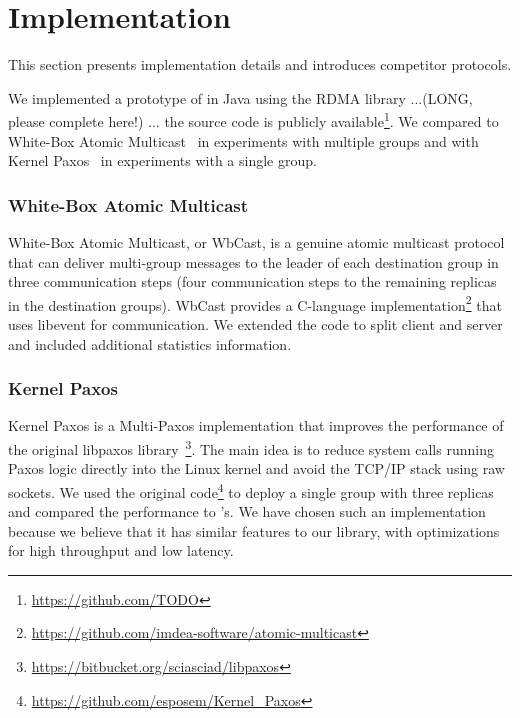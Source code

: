 \section{Implementation}
\label{sec:implementation}
This section presents implementation details and introduces competitor protocols.

We implemented a prototype of \libname in Java using the RDMA library ...(LONG, please complete here!) ... the source code is publicly available\footnote{\url{https://github.com/TODO}}. We compared \libname to White-Box Atomic Multicast~\cite{gotsman2019white} in experiments with multiple groups and with Kernel Paxos~\cite{esposito2018kernel} in experiments with a single group.

\subsubsection*{White-Box Atomic Multicast}
White-Box Atomic Multicast, or WbCast, is a genuine atomic multicast protocol that can deliver multi-group messages to the leader of each destination group in three communication steps (four communication steps to the remaining replicas in the destination groups).
 WbCast provides a C-language implementation\footnote{\url{https://github.com/imdea-software/atomic-multicast}} that uses libevent for communication.
 We extended the code to split client and server and included additional statistics information.

\subsubsection*{Kernel Paxos}
Kernel Paxos is a Multi-Paxos implementation that improves the performance of the original libpaxos library~\footnote{\url{https://bitbucket.org/sciasciad/libpaxos}}.
The main idea is to reduce system calls running Paxos logic directly into the Linux kernel and avoid the TCP/IP stack using raw sockets. 
We used the original code\footnote{\url{https://github.com/esposem/Kernel_Paxos}} to deploy a single group with three replicas and compared the performance to \libname's.
We have chosen such an implementation because we believe that it has similar features to our library, with optimizations for high throughput and low latency.
